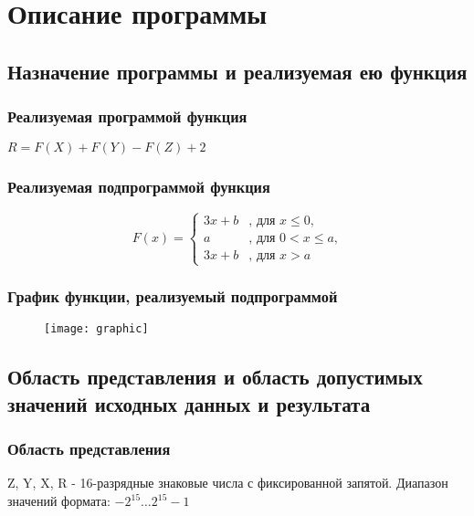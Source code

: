 \section{Описание программы}
\subsection{Назначение программы и реализуемая ею функция}
\subsubsection{Реализуемая программой функция}
	\begin{center}
		$ R = F(X) + F(Y) - F(Z) + 2 $
	\end{center}
\subsubsection{Реализуемая подпрограммой функция}
	\begin{center}
		\[
			F(x) =  \begin{cases}
			3x + b & \textrm{, для } x\leq0\textrm{,}\\
			a & \textrm{, для } 0<x\leq a\textrm{,}\\
			3x + b & \textrm{, для } x>a
			\end{cases}
		\]
	\end{center}

\subsubsection{График функции, реализуемый подпрограммой}
\begin{figure}[H]
	\centering
	\texttt{[image: graphic]}
	\label{pic:graphic}
\end{figure}

\subsection{Область представления и область допустимых значений исходных данных и результата}
\subsubsection{Область представления}
\noindent Z, Y, X, R - 16-разрядные знаковые числа с фиксированной запятой. Диапазон значений формата: $-2^{15}\ldots2^{15}-1$\\


